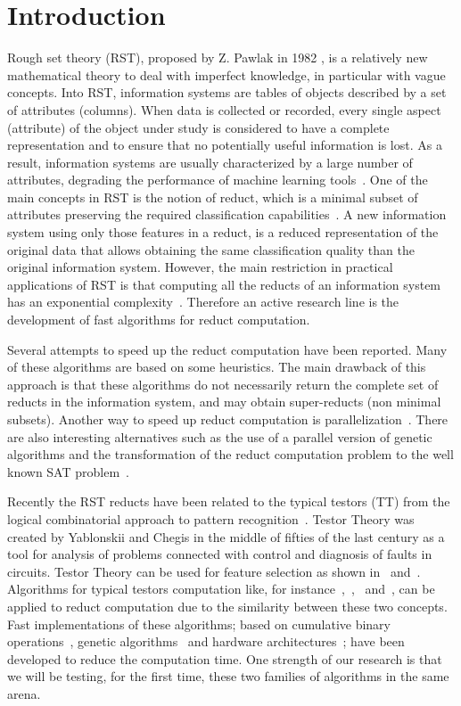 \documentclass[authoryear,11pt]{elsarticle}
\begin{document}
\section{Introduction}
  Rough set theory (RST), proposed by Z. Pawlak in 1982 \citep{Pawlak81,Pawlak81-2,Pawlak82,Pawlak91}, 
  is a relatively new mathematical theory 
  to deal with imperfect knowledge, in particular with vague concepts. Into RST, information systems
  are tables of objects described by a set of attributes (columns). 
  When data is collected or recorded, every single aspect (attribute) of the object under study is considered 
  to have a complete representation and to ensure that no potentially useful information is lost.
  As a result, information systems are usually characterized by a large number of attributes,
  degrading the performance of machine learning tools~\citep{Parthalain08}.
  One of the main concepts in RST is the notion of reduct, which is a minimal subset of attributes 
  preserving the required classification capabilities~\citep{Pawlak91}. A new information system using 
  only those features in a reduct, is a reduced representation of the original data that allows obtaining  
  the same classification quality than the original information system. 
  However, the main restriction in practical applications of RST is that computing all the reducts of an information 
  system has an exponential complexity~\citep{Skowron92}. Therefore an active research line is the development 
  of fast algorithms for reduct computation.
  
  Several attempts to speed up the reduct computation have been reported. Many of these algorithms are 
  based on some heuristics. The main drawback of this approach is that these algorithms do not necessarily 
  return the complete set of reducts in the information system, and may obtain super-reducts (non minimal subsets). 
  Another way to speed up reduct computation is parallelization~\citep{Strakowski08}. There are also 
  interesting alternatives such as the use of a parallel version of genetic algorithms \citep{Wroblewski98}
  and the transformation of the reduct computation problem to the well known SAT problem~\citep{Jensen14}.
  
  Recently the RST reducts have been related to the typical testors (TT) from the logical combinatorial approach to 
  pattern recognition~\citep{Lazo15}. Testor Theory was created by Yablonskii and Chegis in the middle of fifties 
  of the last century as a tool for analysis of problems connected with control and diagnosis of faults in
  circuits. 
  Testor Theory can be used for feature selection as shown in~\citep{Ruiz08} and~\citep{Martinez01}. Algorithms for
  typical testors computation like, for instance~\citep{Ruiz85},~\citep{Santiesteban03},~\citep{Sanchez07} 
  and~\citep{Lias09}, can be applied to reduct computation due to the similarity between these two concepts. 
  Fast implementations of these algorithms; based on cumulative binary operations~\citep{Sanchez10}, genetic 
  algorithms~\citep{Sanchez99} and hardware architectures~\citep{Rojas12}; have been developed to reduce the
  computation time. One strength of our research is that we will be testing, for the first time, these two 
  families of algorithms in the same arena.
     
\end{document}
